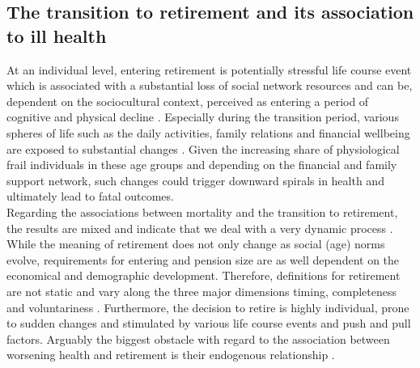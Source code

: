 \documentclass[a4paper,10pt,oneside,english]{article}
\begin{document}
\subsection*{\textsf{The transition to retirement and its association to ill health}}
At an individual level, entering retirement is potentially stressful life course event which is associated with a substantial loss of social network resources and can be, dependent on the sociocultural context, perceived as entering a period of cognitive and physical decline \citep{RN205}. %
Especially during the transition period, various spheres of life such as the daily activities, family relations and financial wellbeing are exposed to substantial changes \citep{RN209}. Given the increasing share of physiological frail individuals in these age groups \citep{RN204} and depending on the financial and family support network, such changes could trigger downward spirals in health and ultimately lead to fatal outcomes.\\ 
Regarding the associations between mortality and the transition to retirement, the results are mixed and indicate that we deal with a very dynamic process \citep{RN202, RN208, RN199, RN207, RN205}. While the meaning of retirement does not only change as social (age) norms evolve, requirements for entering and pension size are as well dependent on the economical and demographic development. Therefore, definitions for retirement are not static and vary along the three major dimensions timing, completeness and voluntariness \citep{RN203}. Furthermore, the decision to retire is highly individual, prone to sudden changes and stimulated by various life course events and push and pull factors. Arguably the biggest obstacle with regard to the association between worsening health and retirement is their endogenous relationship \citep{RN195}.\\
\end{document}
